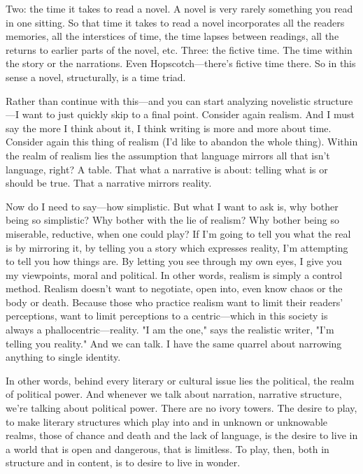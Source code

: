 Two: the time it takes to read a novel. A novel is very rarely something
you read in one sitting. So that time it takes to read a novel
incorporates all the readers memories, all the interstices of time, the
time lapses between readings, all the returns to earlier parts of the
novel, etc. Three: the fictive time. The time within the story or the
narrations. Even Hopscotch---there's fictive time there. So in this
sense a novel, structurally, is a time triad.

Rather than continue with this---and you can start analyzing novelistic
structure---I want to just quickly skip to a final point. Consider again
realism. And I must say the more I think about it, I think writing is
more and more about time. Consider again this thing of realism (I'd like
to abandon the whole thing). Within the realm of realism lies the
assumption that language mirrors all that isn't language, right? A
table. That what a narrative is about: telling what is or should be
true. That a narrative mirrors reality.

Now do I need to say---how simplistic. But what I want to ask is, why
bother being so simplistic? Why bother with the lie of realism? Why
bother being so miserable, reductive, when one could play? If I'm going
to tell you what the real is by mirroring it, by telling you a story
which expresses reality, I'm attempting to tell you how things are. By
letting you see through my own eyes, I give you my viewpoints, moral and
political. In other words, realism is simply a control method. Realism
doesn't want to negotiate, open into, even know chaos or the body or
death. Because those who practice realism want to limit their readers'
perceptions, want to limit perceptions to a centric---which in this
society is always a phallocentric---reality. "I am the one," says the
realistic writer, "I'm telling you reality." And we can talk. I have the
same quarrel about narrowing anything to single identity.

In other words, behind every literary or cultural issue lies the
political, the realm of political power. And whenever we talk about
narration, narrative structure, we're talking about political power.
There are no ivory towers. The desire to play, to make literary
structures which play into and in unknown or unknowable realms, those of
chance and death and the lack of language, is the desire to live in a
world that is open and dangerous, that is limitless. To play, then, both
in structure and in content, is to desire to live in wonder.


